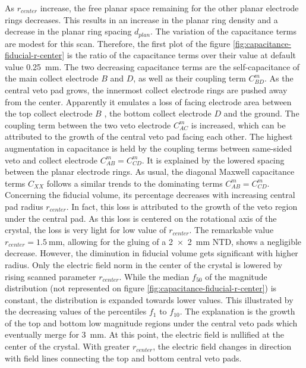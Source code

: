 As $r_{center}$ increase, the free planar space remaining for the other planar electrode rings decreases. This results in an increase in the planar ring density and a decrease in the planar ring spacing $d_{plan}$.
The variation of the capacitance terms are modest for this scan. Therefore, the first plot of the figure \ref{fig:capacitance-fiducial-r-center} is the ratio of the capacitance terms over their value at default value \SI{0.25}{\mm}. The two decreasing capacitance terms are the self-capacitance of the main collect electrode $B$ and $D$, as well as their coupling term $C_{BD}^m$. As the central veto pad grows, the innermost collect electrode rings are pushed away from the center. Apparently it emulates a loss of facing electrode area between the top collect electrode $B$ , the bottom collect electrode $D$ and the ground. The coupling term between the two veto electrode $C_{AC}^m$ is increased, which can be attributed to the growth of the central veto pad facing each other. The highest augmentation in capacitance is held by the coupling terms between same-sided veto and collect electrode $C_{AB}^m=C_{CD}^m$. It is explained by the lowered spacing between the planar electrode rings. As usual, the diagonal Maxwell capacitance terms $C_{XX}$ follows a similar trends to the dominating terms $C_{AB}^m=C_{CD}^m$.
Concerning the fiducial volume, its percentage decreases with increasing central pad radius $r_{center}$. In fact, this loss is attributed to the growth of the veto region under the central pad. As this loss is centered on the rotational axis of the crystal, the loss is very light for low value of $r_{center}$. The remarkable value $r_{center} = \SI{1.5}{\mm}$, allowing for the gluing of a \SI{2 x 2}{\mm} NTD, shows a negligible decrease. However, the diminution in fiducial volume gets significant with higher radius.
Only the electric field norm in the center of the crystal is lowered by rising scanned parameter $r_{center}$. While the median $f_{50}$ of the magnitude distribution (not represented on figure \ref{fig:capacitance-fiducial-r-center}) is constant, the distribution is expanded towards lower values. This illustrated by the decreasing values of the percentiles $f_{1}$ to $f_{10}$. The explanation is the growth of the top and bottom low magnitude regions under the central veto pads which eventually merge for \SI{3}{\mm}. At this point, the electric field is nullified at the center of the crystal. With greater $r_{center}$, the electric field changes in direction with field lines connecting the top and bottom central veto pads.

